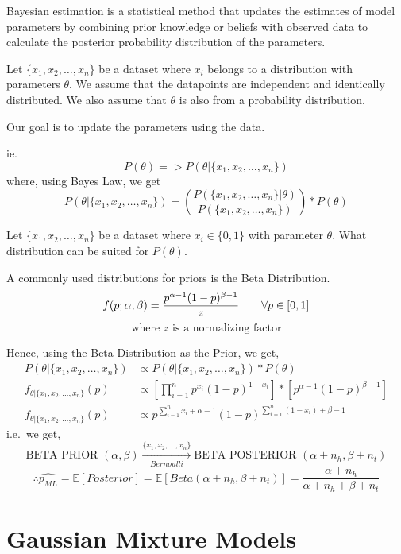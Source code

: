 \documentclass[
]{article}
\begin{document}
Bayesian estimation is a statistical method that updates the estimates
of model parameters by combining prior knowledge or beliefs with
observed data to calculate the posterior probability distribution of the
parameters.

Let \(\{x_1, x_2, \ldots, x_n\}\) be a dataset where \(x_i\) belongs to
a distribution with parameters \(\theta\). We assume that the datapoints
are independent and identically distributed. We also assume that
\(\theta\) is also from a probability distribution.

Our goal is to update the parameters using the data.

ie. \[
P(\theta)=>P(\theta|\{x_1, x_2, \ldots, x_n\})
\] where, using Bayes Law, we get \[
P(\theta|\{x_1, x_2, \ldots, x_n\})=\left ( \frac{P(\{x_1, x_2, \ldots, x_n\}|\theta)}{P(\{x_1, x_2, \ldots, x_n\})} \right )*P(\theta)
\]

Let \(\{x_1, x_2, \ldots, x_n\}\) be a dataset where \(x_i \in \{0,1\}\)
with parameter \(\theta\). What distribution can be suited for
\(P(\theta)\).

A commonly used distributions for priors is the Beta Distribution. \[
f(p;\alpha,\beta) = \frac{p^{\alpha-1}(1-p)^{\beta-1}}{z} \hspace{2em} \forall p \in [0,1] \\
\] \[
\text{where $z$ is a normalizing factor}
\]

Hence, using the Beta Distribution as the Prior, we get, \begin{align*}
P(\theta|\{x_1, x_2, \ldots, x_n\}) &\propto P(\theta|\{x_1, x_2, \ldots, x_n\})*P(\theta) \\
f_{\theta|\{x_1, x_2, \ldots, x_n\}}(p) &\propto \left [ \prod _{i=1} ^n {p^{x_i}(1-p)^{1-x_i}} \right ]*\left [ p^{\alpha-1}(1-p)^{\beta-1} \right ] \\
f_{\theta|\{x_1, x_2, \ldots, x_n\}}(p) &\propto p^{\sum _{i=1} ^n x_i + \alpha - 1}(1-p)^{\sum _{i=1} ^n(1-x_i) + \beta - 1}
\end{align*} i.e.~we get, \[
\text{BETA PRIOR }(\alpha, \beta) \xrightarrow[Bernoulli]{\{x_1, x_2, \ldots, x_n\}} \text{BETA POSTERIOR }(\alpha + n_h, \beta + n_t)
\] \[
\therefore \hat{p_{ML}} = \mathbb{E}[Posterior]=\mathbb{E}[Beta(\alpha +n_h, \beta + n_t)]= \frac{\alpha + n_h}{\alpha + n_h + \beta + n_t}
\]

\hypertarget{gaussian-mixture-models}{%
\section{Gaussian Mixture Models}\label{gaussian-mixture-models}}
\end{document}
